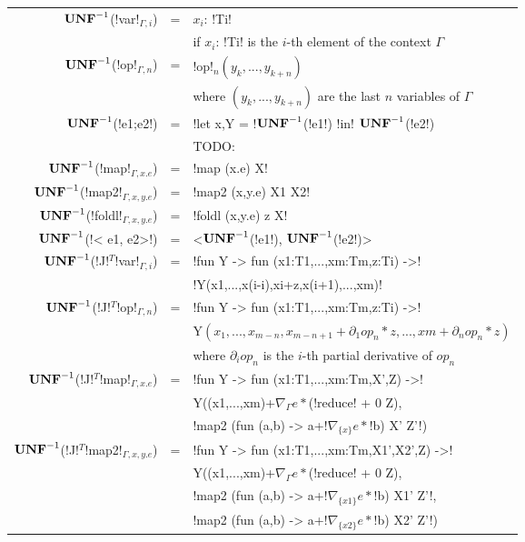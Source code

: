 \begin{figure*}[t]
    \begin{tabular}{r c l}
    $\mathbf{UNF}^{-1}$(!var!$_{\Gamma,i}$) &=& $x_i$: !Ti! \\
    && if $x_i$: !Ti! is the $i$-th element of the context $\Gamma$ \\
    $\mathbf{UNF}^{-1}$(!op!$_{\Gamma,n}$) &=& !op!$_n(y_k,...,y_{k+n})$ \\
    && where $(y_k,...,y_{k+n})$ are the last $n$ variables of $\Gamma$ \\ 
    $\mathbf{UNF}^{-1}$(!e1;e2!) &=& !let x,Y = !$\mathbf{UNF}^{-1}$(!e1!) !in! $\mathbf{UNF}^{-1}$(!e2!) \\ 
    && TODO: \\ 
    $\mathbf{UNF}^{-1}$(!map!$_{\Gamma,x.e}$) &=& !map (x.e) X! \\ 
    $\mathbf{UNF}^{-1}$(!map2!$_{\Gamma,x,y.e}$) &=& !map2 (x,y.e) X1 X2! \\ 
    $\mathbf{UNF}^{-1}$(!foldl!$_{\Gamma,x,y.e}$) &=& !foldl (x,y.e) z X! \\ 
    $\mathbf{UNF}^{-1}$(!< e1, e2>!) &=& <$\mathbf{UNF}^{-1}$(!e1!), $\mathbf{UNF}^{-1}$(!e2!)> \\ 
    $\mathbf{UNF}^{-1}$(!J!$^T$!var!$_{\Gamma,i}$) &=& !fun Y -> fun (x1:T1,...,xm:Tm,z:Ti) ->!\\ 
    && !Y(x1,...,x(i-i),xi+z,x(i+1),...,xm)! \\
    $\mathbf{UNF}^{-1}$(!J!$^T$!op!$_{\Gamma,n}$) &=& !fun Y -> fun (x1:T1,...,xm:Tm,z:Ti) ->!\\ 
    && Y$(x_1,...,x_{m-n},x_{m-n+1}+\partial_1op_n*z,...,xm+\partial_nop_n*z)$ \\
    && where $\partial_iop_n$ is the $i$-th partial derivative of $op_n$ \\
    $\mathbf{UNF}^{-1}$(!J!$^T$!map!$_{\Gamma,x.e}$) &=&  !fun Y -> fun (x1:T1,...,xm:Tm,X',Z) ->!\\
    && Y((x1,...,xm)+$\nabla_{\Gamma}e *$(!reduce! + 0 Z),\\
    && !map2 (fun (a,b) -> a+!$\nabla_{\{x\}}e *$!b) X' Z'!) \\
    $\mathbf{UNF}^{-1}$(!J!$^T$!map2!$_{\Gamma,x,y.e}$) &=&  !fun Y -> fun (x1:T1,...,xm:Tm,X1',X2',Z) ->!\\
    && Y((x1,...,xm)+$\nabla_{\Gamma}e *$(!reduce! + 0 Z),\\
    && !map2 (fun (a,b) -> a+!$\nabla_{\{x1\}}e *$!b) X1' Z'!, \\
    && !map2 (fun (a,b) -> a+!$\nabla_{\{x2\}}e *$!b) X2' Z'!) \\

\end{tabular}
\end{figure*}
